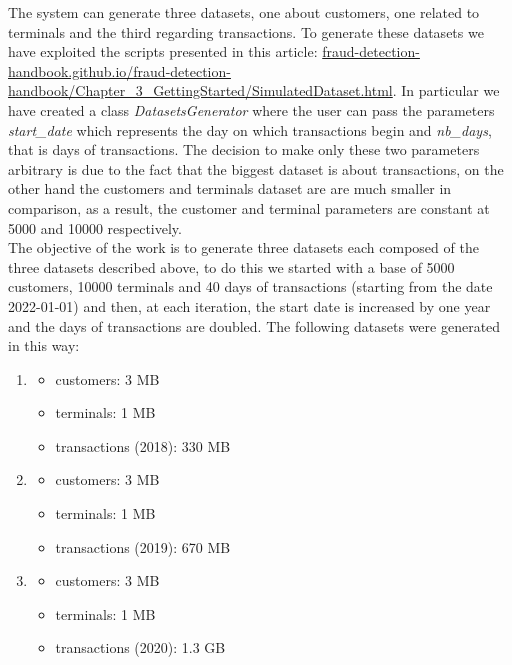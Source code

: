 \documentclass[runningheads]{llncs}
\begin{document}
The system can generate three datasets, one about customers, one related to terminals and the third regarding transactions. To generate these datasets we have exploited the scripts presented in this article: \url{fraud-detection-handbook.github.io/fraud-detection-handbook/Chapter_3_GettingStarted/SimulatedDataset.html}. In particular we have created a class \emph{DatasetsGenerator} where the user can pass the parameters \emph{start\_date} which represents the day on which transactions begin and \emph{nb\_days}, that is days of transactions. The decision to make only these two parameters arbitrary is due to the fact that the biggest dataset is about transactions, on the other hand the customers and terminals dataset are are much smaller in comparison, as a result, the customer and terminal parameters are constant at 5000 and 10000 respectively.
\\
The objective of the work is to generate three datasets each composed of the three datasets described above, to do this we started with a base of 5000 customers, 10000 terminals and 40 days of transactions (starting from the date 2022-01-01) and then, at each iteration, the start date is increased by one year and the days of transactions are doubled. The following datasets were generated in this way:

\begin{enumerate}
    \item \begin{itemize}
        \item customers: 3 MB
        \item terminals: 1 MB
        \item transactions (2018): 330 MB
    \end{itemize}
    \item \begin{itemize}
        \item customers: 3 MB
        \item terminals: 1 MB
        \item transactions (2019): 670 MB
    \end{itemize}
    \item \begin{itemize}
        \item customers: 3 MB
        \item terminals: 1 MB
        \item transactions (2020): 1.3 GB
    \end{itemize}
\end{enumerate}
\end{document}
